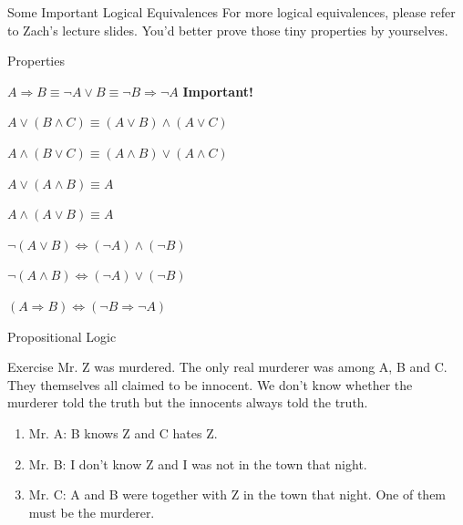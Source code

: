 \begin{frame}{Some Important Logical Equivalences}
    For more logical equivalences, please refer to Zach's lecture slides. You'd better prove those tiny properties by yourselves.
    \begin{block}{Properties}
    \begin{description}[Contraposition]
        \item [Implication] $A\Rightarrow B\equiv \neg A\vee B\equiv \neg B\Rightarrow\neg A$ \textbf{ Important!}
        \item [Distributivity] $A\vee(B\wedge C)\equiv (A\vee B)\wedge(A\vee C)$
        \item [] $A\wedge(B\vee C)\equiv (A\wedge B)\vee(A\wedge C)$
        \item [Absorption] $A\vee (A\wedge B)\equiv A$
        \item [] $A\wedge (A\vee B)\equiv A$
        \item [De Morgan's] $\neg(A\vee B)\Leftrightarrow(\neg A)\wedge(\neg B)$
        \item [] $\neg(A\wedge B)\Leftrightarrow(\neg A)\vee(\neg B)$
        \item [Contraposition] $(A\Rightarrow B)\Leftrightarrow (\neg B\Rightarrow \neg A)$
    \end{description}
    \end{block}
\end{frame}
\iffalse
\begin{frame}{Propositional Logic}
    \begin{block}{Exercise}
        Mr. Z was murdered. The only real murderer was among A, B and C. They themselves all claimed to be innocent. We don't know whether the murderer told the truth but the innocents always told the truth.
        \begin{enumerate}
            \item Mr. A: B knows Z and C hates Z.
            \item Mr. B: I don't know Z and I was not in the town that night.
            \item Mr. C: A and B were together with Z in the town that night. One of them must be the murderer.
        \end{enumerate}
    \end{block}
\end{frame}

